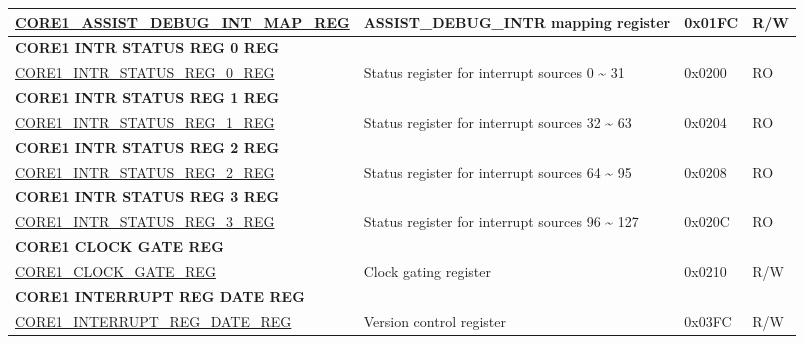 \begin{longtable}{ | p{7.5cm} | p{7.2cm} | p{1.3cm} | p{1cm} | }
\hyperref[regdesc:CORE1ASSISTDEBUGINTMAPREG]{CORE1\_ASSIST\_DEBUG\_INT\_MAP\_REG} & ASSIST\_DEBUG\_INTR mapping register & 0x01FC & R/W \\ \hline
\multicolumn{4}{|l|}{\textbf{CORE1 INTR STATUS REG 0 REG}} \\ \hline
\hyperref[regdesc:CORE1INTRSTATUSREG0REG]{CORE1\_INTR\_STATUS\_REG\_0\_REG} & Status register for interrupt sources 0 \~{} 31 & 0x0200 & RO \\ \hline
\multicolumn{4}{|l|}{\textbf{CORE1 INTR STATUS REG 1 REG}} \\ \hline
\hyperref[regdesc:CORE1INTRSTATUSREG1REG]{CORE1\_INTR\_STATUS\_REG\_1\_REG} & Status register for interrupt sources 32 \~{} 63 & 0x0204 & RO \\ \hline
\multicolumn{4}{|l|}{\textbf{CORE1 INTR STATUS REG 2 REG}} \\ \hline
\hyperref[regdesc:CORE1INTRSTATUSREG2REG]{CORE1\_INTR\_STATUS\_REG\_2\_REG} & Status register for interrupt sources 64 \~{} 95 & 0x0208 & RO \\ \hline
\multicolumn{4}{|l|}{\textbf{CORE1 INTR STATUS REG 3 REG}} \\ \hline
\hyperref[regdesc:CORE1INTRSTATUSREG3REG]{CORE1\_INTR\_STATUS\_REG\_3\_REG} & Status register for interrupt sources 96 \~{} 127 & 0x020C & RO \\ \hline
\multicolumn{4}{|l|}{\textbf{CORE1 CLOCK GATE REG}} \\ \hline
\hyperref[regdesc:CORE1CLOCKGATEREG]{CORE1\_CLOCK\_GATE\_REG} & Clock gating register & 0x0210 & R/W \\ \hline
\multicolumn{4}{|l|}{\textbf{CORE1 INTERRUPT REG DATE REG}} \\ \hline
\hyperref[regdesc:CORE1INTERRUPTREGDATEREG]{CORE1\_INTERRUPT\_REG\_DATE\_REG} & Version control register & 0x03FC & R/W \\ \hline
\end{longtable}
